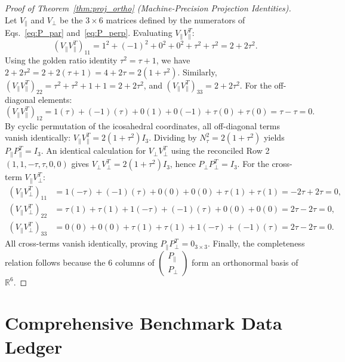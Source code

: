 \documentclass[11pt,a4paper]{article}
\theoremstyle{definition}
\newcommand{\R}{\mathbb{R}}
\begin{document}
\begin{proof}[Proof of Theorem~\ref{thm:proj_ortho} (Machine-Precision Projection Identities)]
Let $V_\parallel$ and $V_\perp$ be the $3 \times 6$ matrices defined by the numerators of Eqs.~\eqref{eq:P_par} and~\eqref{eq:P_perp}. 
Evaluating $V_\parallel V_\parallel^T$:
\begin{equation}
(V_\parallel V_\parallel^T)_{11} = 1^2 + (-1)^2 + 0^2 + 0^2 + \tau^2 + \tau^2 = 2 + 2\tau^2.
\end{equation}
Using the golden ratio identity $\tau^2 = \tau + 1$, we have $2 + 2\tau^2 = 2 + 2(\tau + 1) = 4 + 2\tau = 2(1+\tau^2)$. 
Similarly, $(V_\parallel V_\parallel^T)_{22} = \tau^2 + \tau^2 + 1 + 1 = 2 + 2\tau^2$, and $(V_\parallel V_\parallel^T)_{33} = 2 + 2\tau^2$. 
For the off-diagonal elements:
\begin{equation}
(V_\parallel V_\parallel^T)_{12} = 1(\tau) + (-1)(\tau) + 0(1) + 0(-1) + \tau(0) + \tau(0) = \tau - \tau = 0.
\end{equation}
By cyclic permutation of the icosahedral coordinates, all off-diagonal terms vanish identically: $V_\parallel V_\parallel^T = 2(1+\tau^2) I_3$. 
Dividing by $N_\tau^2 = 2(1+\tau^2)$ yields $P_\parallel P_\parallel^T = I_3$. 
An identical calculation for $V_\perp V_\perp^T$ using the reconciled Row 2 $(1, 1, -\tau, \tau, 0, 0)$ gives $V_\perp V_\perp^T = 2(1+\tau^2) I_3$, hence $P_\perp P_\perp^T = I_3$. 
For the cross-term $V_\parallel V_\perp^T$:
\begin{align}
(V_\parallel V_\perp^T)_{11} &= 1(-\tau) + (-1)(\tau) + 0(0) + 0(0) + \tau(1) + \tau(1) = -2\tau + 2\tau = 0, \\
(V_\parallel V_\perp^T)_{22} &= \tau(1) + \tau(1) + 1(-\tau) + (-1)(\tau) + 0(0) + 0(0) = 2\tau - 2\tau = 0, \\
(V_\parallel V_\perp^T)_{33} &= 0(0) + 0(0) + \tau(1) + \tau(1) + 1(-\tau) + (-1)(\tau) = 2\tau - 2\tau = 0.
\end{align}
All cross-terms vanish identically, proving $P_\parallel P_\perp^T = 0_{3 \times 3}$. 
Finally, the completeness relation follows because the 6 columns of $\begin{pmatrix} P_\parallel \\ P_\perp \end{pmatrix}$ form an orthonormal basis of $\R^6$.
\end{proof}

\section{Comprehensive Benchmark Data Ledger}
\end{document}

